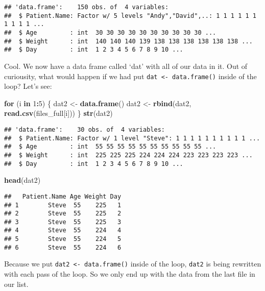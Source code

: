 \documentclass[
]{article}
\newenvironment{Shaded}{\begin{snugshade}}{\end{snugshade}}
\newcommand{\ControlFlowTok}[1]{\textcolor[rgb]{0.13,0.29,0.53}{\textbf{#1}}}
\newcommand{\DecValTok}[1]{\textcolor[rgb]{0.00,0.00,0.81}{#1}}
\newcommand{\KeywordTok}[1]{\textcolor[rgb]{0.13,0.29,0.53}{\textbf{#1}}}
\newcommand{\NormalTok}[1]{#1}
\newcommand{\OperatorTok}[1]{\textcolor[rgb]{0.81,0.36,0.00}{\textbf{#1}}}
\newcommand{\StringTok}[1]{\textcolor[rgb]{0.31,0.60,0.02}{#1}}
\begin{document}
\begin{verbatim}
## 'data.frame':    150 obs. of  4 variables:
##  $ Patient.Name: Factor w/ 5 levels "Andy","David",..: 1 1 1 1 1 1 1 1 1 1 ...
##  $ Age         : int  30 30 30 30 30 30 30 30 30 30 ...
##  $ Weight      : int  140 140 140 139 138 138 138 138 138 138 ...
##  $ Day         : int  1 2 3 4 5 6 7 8 9 10 ...
\end{verbatim}

Cool. We now have a data frame called `dat' with all of our data in it.
Out of curiousity, what would happen if we had put
\texttt{dat\ \textless{}-\ data.frame()} inside of the loop? Let's see:

\begin{Shaded}
\begin{Highlighting}[]
\ControlFlowTok{for}\NormalTok{ (i }\ControlFlowTok{in} \DecValTok{1}\OperatorTok{:}\DecValTok{5}\NormalTok{) \{}
\NormalTok{        dat2 <-}\StringTok{ }\KeywordTok{data.frame}\NormalTok{()}
\NormalTok{        dat2 <-}\StringTok{ }\KeywordTok{rbind}\NormalTok{(dat2, }\KeywordTok{read.csv}\NormalTok{(files_full[i]))}
\NormalTok{\}}
\KeywordTok{str}\NormalTok{(dat2)}
\end{Highlighting}
\end{Shaded}

\begin{verbatim}
## 'data.frame':    30 obs. of  4 variables:
##  $ Patient.Name: Factor w/ 1 level "Steve": 1 1 1 1 1 1 1 1 1 1 ...
##  $ Age         : int  55 55 55 55 55 55 55 55 55 55 ...
##  $ Weight      : int  225 225 225 224 224 224 223 223 223 223 ...
##  $ Day         : int  1 2 3 4 5 6 7 8 9 10 ...
\end{verbatim}

\begin{Shaded}
\begin{Highlighting}[]
\KeywordTok{head}\NormalTok{(dat2)}
\end{Highlighting}
\end{Shaded}

\begin{verbatim}
##   Patient.Name Age Weight Day
## 1        Steve  55    225   1
## 2        Steve  55    225   2
## 3        Steve  55    225   3
## 4        Steve  55    224   4
## 5        Steve  55    224   5
## 6        Steve  55    224   6
\end{verbatim}

Because we put \texttt{dat2\ \textless{}-\ data.frame()} inside of the
loop, \texttt{dat2} is being rewritten with each pass of the loop. So we
only end up with the data from the last file in our list.
\end{document}
